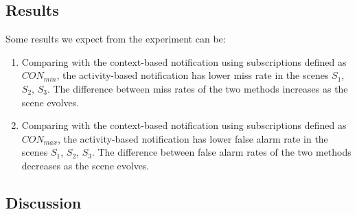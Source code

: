 
\subsection{Results} %
\label{sub:results}
Some results we expect from the experiment can be:

\begin{enumerate}
	\item Comparing with the context-based notification using subscriptions defined as $CON_{min}$, the activity-based notification has lower miss rate in the scenes $S_1$, $S_2$, $S_3$. The difference between miss rates of the two methods increases as the scene evolves.
	\item Comparing with the context-based notification using subscriptions defined as $CON_{max}$, the activity-based notification has lower false alarm rate in the scenes $S_1$, $S_2$, $S_3$. The difference between false alarm rates of the two methods decreases as the scene evolves.
\end{enumerate}


\subsection{Discussion} %
\label{sub:discussion}







 

